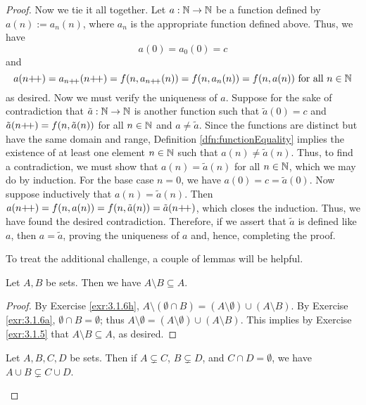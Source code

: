 \documentclass[../main.tex]{subfiles}
\begin{document}
\begin{enumerate}[ref={\thesection.\arabic*}]
\begin{proof}
        Now we tie it all together. Let $a:\mathbb{N}\to\mathbb{N}$ be a function defined by $a(n):=a_n(n)$, where $a_n$ is the appropriate function defined above. Thus, we have
        \begin{equation*}
            a(0) = a_0(0)
            = c
        \end{equation*}
        and
        \begin{equation*}
            a(n{+\!+}) = a_{n{+\!+}}(n{+\!+})
            = f(n,a_{n{+\!+}}(n))
            = f(n,a_n(n))
            = f(n,a(n))\text{ for all }n\in\mathbb{N}
        \end{equation*}
        as desired. Now we must verify the uniqueness of $a$. Suppose for the sake of contradiction that $\tilde{a}:\mathbb{N}\to\mathbb{N}$ is another function such that $\tilde{a}(0)=c$ and $\tilde{a}(n{+\!+})=f(n,\tilde{a}(n))$ for all $n\in\mathbb{N}$ and $a\neq\tilde{a}$. Since the functions are distinct but have the same domain and range, Definition \ref{dfn:functionEquality} implies the existence of at least one element $n\in\mathbb{N}$ such that $a(n)\neq\tilde{a}(n)$. Thus, to find a contradiction, we must show that $a(n)=\tilde{a}(n)$ for all $n\in\mathbb{N}$, which we may do by induction. For the base case $n=0$, we have $a(0)=c=\tilde{a}(0)$. Now suppose inductively that $a(n)=\tilde{a}(n)$. Then $a(n{+\!+})=f(n,a(n))=f(n,\tilde{a}(n))=\tilde{a}(n{+\!+})$, which closes the induction. Thus, we have found the desired contradiction. Therefore, if we assert that $\tilde{a}$ is defined like $a$, then $a=\tilde{a}$, proving the uniqueness of $a$ and, hence, completing the proof.\par
        \medskip
        To treat the additional challenge, a couple of lemmas will be helpful.
        \begin{lem}\label{lem:differenceSetsSubsets}
            Let $A,B$ be sets. Then we have $A\setminus B\subseteq A$.
            \begin{proof}
                By Exercise \ref{exr:3.1.6h}, $A\setminus(\emptyset\cap B)=(A\setminus\emptyset)\cup(A\setminus B)$. By Exercise \ref{exr:3.1.6a}, $\emptyset\cap B=\emptyset$; thus $A\setminus\emptyset=(A\setminus\emptyset)\cup(A\setminus B)$. This implies by Exercise \ref{exr:3.1.5} that $A\setminus B\subseteq A$, as desired.
            \end{proof}
        \end{lem}
        \begin{lem}\label{lem:unionSubsetsNeq}
            Let $A,B,C,D$ be sets. Then if $A\subsetneq C$, $B\subsetneq D$, and $C\cap D=\emptyset$, we have $A\cup B\subsetneq C\cup D$.

\end{lem}
\end{proof}
\end{enumerate}
\end{document}
